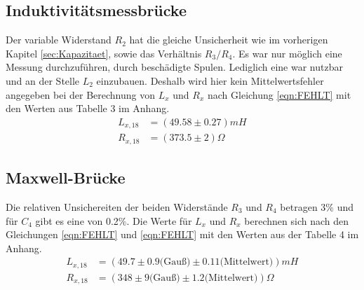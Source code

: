 \subsection{Induktivitätsmessbrücke}
\label{sec:Induktiv}
Der variable Widerstand $R_2$ hat die gleiche Unsicherheit wie im vorherigen Kapitel \ref{sec:Kapazitaet}, sowie das Verhältnis $R_3/R_4$.
Es war nur möglich eine Messung durchzuführen, durch beschädigte Spulen.
Lediglich eine war nutzbar und an der Stelle $L_2$ einzubauen.
Deshalb wird hier kein Mittelwertsfehler angegeben bei der Berechnung von $L_x$ und $R_x$ nach Gleichung \ref{eqn:FEHLT} mit den Werten aus Tabelle 3 im Anhang.
\begin{align}
  L_{x,18} &= (49.58 \pm 0.27) mH \\
  R_{x,18} &= (373.5 \pm 2) \Omega
\end{align}

\subsection{Maxwell-Brücke}
\label{sec:Maxwell}
Die relativen Unsichereiten der beiden Widerstände $R_3$ und $R_4$ betragen 3\% und für $C_4$ gibt es eine von 0.2\%.
Die Werte für $L_x$ und $R_x$ berechnen sich nach den Gleichungen \ref{eqn:FEHLT} und \ref{eqn:FEHLT} mit den Werten aus der Tabelle 4 im Anhang.
\begin{align}
  L_{x,18} &= (49.7 \pm 0.9 \textrm{(Gauß)} \pm 0.11 \textrm{(Mittelwert)}) mH \\
  R_{x,18} &= (348 \pm 9 \textrm{(Gauß)} \pm 1.2 \textrm{(Mittelwert)}) \Omega
\end{align}

